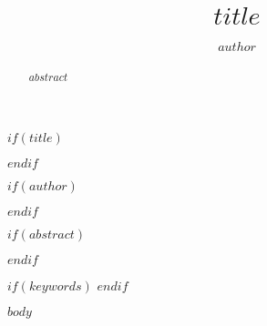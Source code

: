 \documentclass[runningheads,a4paper]{llncs}
\begin{document}
$if(title)$
\title{$title$}
$endif$


$if(author)$
\author{$author$}
$endif$




%
\iffalse
\authorinfo{
  $for(author)$$author.name$$sep$\and $endfor$
}{
$for(organization)$
  $organization.name$
$endfor$
}{
  \{$for(author)$$author.email$$sep$,$endfor$\}
}
\fi


\maketitle


$if(abstract)$
	\begin{abstract}
		$abstract$
	\end{abstract}
$endif$

$if(keywords)$
$endif$

$body$
\end{document}
